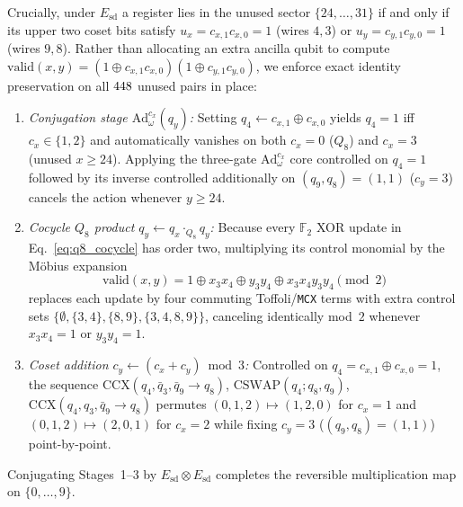 \documentclass[aps,prx,twocolumn,superscriptaddress,nofootinbib]{revtex4-2}
\begin{document}
Crucially, under $E_{\mathrm{sd}}$ a register lies in the unused sector $\{24,\dots,31\}$ if and only if its upper two coset bits satisfy $u_x = c_{x,1} c_{x,0} = 1$ (wires $4,3$) or $u_y = c_{y,1} c_{y,0} = 1$ (wires $9,8$). Rather than allocating an extra ancilla qubit to compute $\mathrm{valid}(x,y) = (1 \oplus c_{x,1}c_{x,0})(1 \oplus c_{y,1}c_{y,0})$, we enforce exact identity preservation on all $448$ unused pairs in place:
\begin{enumerate}
  \item \emph{Conjugation stage $\mathrm{Ad}_\omega^{c_x}(q_y)$:} Setting $q_4 \leftarrow c_{x,1} \oplus c_{x,0}$ yields $q_4 = 1$ iff $c_x \in \{1,2\}$ and automatically vanishes on both $c_x = 0$ ($Q_8$) and $c_x = 3$ (unused $x \ge 24$). Applying the three-gate $\mathrm{Ad}_\omega^{c_x}$ core controlled on $q_4 = 1$ followed by its inverse controlled additionally on $(q_9,q_8) = (1,1)$ ($c_y = 3$) cancels the action whenever $y \ge 24$.
  \item \emph{Cocycle $Q_8$ product $q_y \leftarrow q_x \cdot_{Q_8} q_y$:} Because every $\mathbb{F}_2$ XOR update in Eq.~\eqref{eq:q8_cocycle} has order two, multiplying its control monomial by the M\"obius expansion
  \begin{equation}
    \mathrm{valid}(x,y) = 1 \oplus x_3 x_4 \oplus y_3 y_4 \oplus x_3 x_4 y_3 y_4 \pmod{2}
    \label{eq:mobius_gate}
  \end{equation}
  replaces each update by four commuting Toffoli/\texttt{MCX} terms with extra control sets $\{\emptyset, \{3,4\}, \{8,9\}, \{3,4,8,9\}\}$, canceling identically mod~$2$ whenever $x_3 x_4 = 1$ or $y_3 y_4 = 1$.
  \item \emph{Coset addition $c_y \leftarrow (c_x + c_y) \bmod 3$:} Controlled on $q_4 = c_{x,1} \oplus c_{x,0} = 1$, the sequence $\mathrm{CCX}(q_4,\bar{q}_3,\bar{q}_9 \to q_8)$, $\mathrm{CSWAP}(q_4; q_8, q_9)$, $\mathrm{CCX}(q_4,q_3,\bar{q}_9 \to q_8)$ permutes $(0,1,2) \mapsto (1,2,0)$ for $c_x = 1$ and $(0,1,2) \mapsto (2,0,1)$ for $c_x = 2$ while fixing $c_y = 3$ ($(q_9,q_8) = (1,1)$) point-by-point.
\end{enumerate}
Conjugating Stages~1--3 by $E_{\mathrm{sd}} \otimes E_{\mathrm{sd}}$ completes the reversible multiplication map on $\{0,\dots,9\}$.
\end{document}
